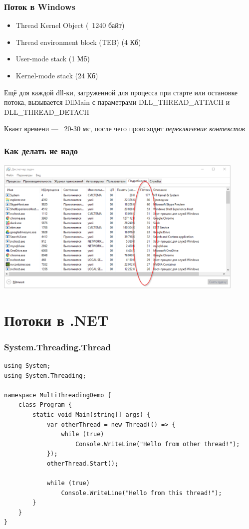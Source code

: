 \documentclass[xetex,mathserif,serif]{beamer}
\begin{document}
	\begin{frame}
		\frametitle{Поток в Windows}
		\begin{itemize}
			\item Thread Kernel Object (~1240 байт)
			\item Thread environment block (TEB) (4 Кб)
			\item User-mode stack (1 Мб)
			\item Kernel-mode stack (24 Кб)
		\end{itemize}

		Ещё для каждой dll-ки, загруженной для процесса при старте или остановке потока, вызывается DllMain с параметрами DLL\_THREAD\_ATTACH и DLL\_THREAD\_DETACH

		\vspace{3mm}
		Квант времени --- ~20-30 мс, после чего происходит \textit{переключение контекстов}
	\end{frame}

	\begin{frame}
		\frametitle{Как делать не надо}
		\begin{center}
			\includegraphics[width=0.9\textwidth]{threadsEverywhere.png}
		\end{center}
	\end{frame}

	\section{Потоки в .NET}

	\begin{frame}[fragile]
		\frametitle{System.Threading.Thread}
		\begin{footnotesize}
			\begin{verbatim}
using System;
using System.Threading;

namespace MultiThreadingDemo {
    class Program {
        static void Main(string[] args) {
            var otherThread = new Thread(() => {
                while (true)
                    Console.WriteLine("Hello from other thread!");
            });
            otherThread.Start();

            while (true)
                Console.WriteLine("Hello from this thread!");
        }
    }
}
			\end{verbatim}
		\end{footnotesize}
	\end{frame}
\end{document}
